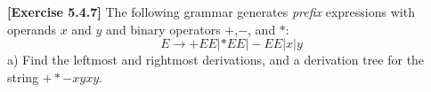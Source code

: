 \textbf{[Exercise 5.4.7]} The following grammar generates \textit{prefix}
expressions with operands $x$ and $y$ and binary operators $+$,$-$, 
and $*$:\\
$$E\rightarrow +EE | *EE | -EE |x|y$$
a) Find the leftmost and rightmost derivations, and a derivation tree
for the string $+*-xyxy$.